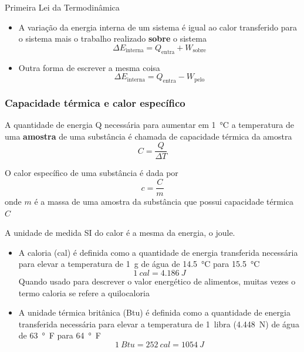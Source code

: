 \documentclass[t,%
brazilian,%
11pt,%
aspectratio=169,%
table%
]{beamer}
\begin{document}
\begin{frame}[c]
    \begin{block}{Primeira Lei da Termodinâmica}
        \begin{itemize}
            \item A variação da energia interna de um sistema é igual ao calor
                transferido para o sistema mais o trabalho realizado
                \textbf{sobre} o sistema
                \[
                    \Delta E_{\text{interna}} = Q_{\text{entra}} + W_{\text{sobre}}
                \]
            \item Outra forma de escrever a mesma coisa
                \[
                    \Delta E_{\text{interna}} = Q_{\text{entra}} - W_{\text{pelo}}
                \]
        \end{itemize}
    \end{block}
\end{frame}

\begin{frame}
    \frametitle{Capacidade térmica e calor específico}
    A quantidade de energia Q necessária para aumentar em \SI{1}{\celsius} a
    temperatura de uma \textbf{amostra} de uma substância é chamada de
    capacidade térmica da amostra
    \[
        C=\frac{Q}{\Delta T}
    \]

    O calor específico de uma substância é dada por
    \[
        c=\frac{C}{m}
    \]
    onde $m$ é a massa de uma amostra da substância que possui capacidade térmica $C$
\end{frame}

\begin{frame}
    A unidade de medida SI do calor é a mesma da energia, o joule.
    \begin{itemize}
        \item A caloria (cal) é definida como a quantidade de energia
            transferida necessária para elevar a temperatura de \SI{1}{g} de
            água de \SI{14.5}{\celsius} para \SI{15,5}{\celsius}
            \[
                \SI{1}{cal} = \SI{4,186}{J}
            \]
            Quando usado para descrever o valor energético de alimentos, muitas
            vezes o termo caloria se refere a quilocaloria

        \item A unidade térmica britânica (Btu) é definida como a quantidade de
            energia transferida necessária para elevar a temperatura de
            \SI{1}{libra} (\SI{4,448}{N}) de água de \SI{63}{\degree F} para
            \SI{64}{\degree F}
            \[
                \SI{1}{Btu} = \SI{252}{cal} = \SI{1054}{J}
            \]
    \end{itemize} 
\end{frame}
\end{document}
